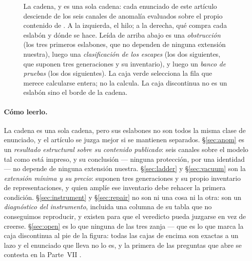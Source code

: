 \documentclass[11pt,a4paper]{article}
\newcommand{\amin}{\alpha_{\min}}
\begin{document}
\begin{figure}[p]
\caption{La cadena, y es una sola cadena: cada enunciado de este artículo desciende de los seis
canales de anomalía evaluados sobre el propio contenido de \cite{KM25}. A la izquierda, el hilo; a la
derecha, qué compra cada eslabón y dónde se hace. Leída de arriba abajo es una \emph{obstrucción}
(los tres primeros eslabones, que no dependen de ninguna extensión nuestra), luego una
\emph{clasificación de los escapes} (los dos siguientes, que suponen tres generaciones y su
inventario), y luego un \emph{banco de pruebas} (los dos siguientes). La caja verde selecciona la
fila que merece calcularse entera; no la calcula. La caja discontinua no es un eslabón sino el borde
de la cadena.}
\label{fig:chain}
\end{figure}

\paragraph{Cómo leerlo.} La cadena es una sola cadena, pero sus eslabones no son todos la misma clase
de enunciado, y el artículo se juzga mejor si se mantienen separados. \S\ref{sec:anom} es un
\emph{resultado estructural sobre su contenido publicado}: seis canales sobre el modelo tal como está
impreso, y su conclusión --- ninguna protección, por una identidad --- no depende de ninguna extensión
nuestra. \S\ref{sec:ladder} y \S\ref{sec:vacuum} son la \emph{extensión mínima y su precio}: suponen
tres generaciones y su propio inventario de representaciones, y quien amplíe ese inventario debe
rehacer la primera condición. \S\ref{sec:instrument} y \S\ref{sec:repair} no son ni una cosa ni la
otra: son un \emph{diagnóstico del instrumento}, incluida una columna de su tabla que no conseguimos
reproducir, y existen para que el veredicto pueda juzgarse en vez de creerse. \S\ref{sec:open} es lo
que ninguna de las tres zanja --- que es lo que marca la caja discontinua al pie de la figura: todas
las cajas de encima son exactas a un lazo y el enunciado que lleva no lo es, y la primera de las
preguntas que abre se contesta en la Parte~VII \cite{PartVII}.
\end{document}
